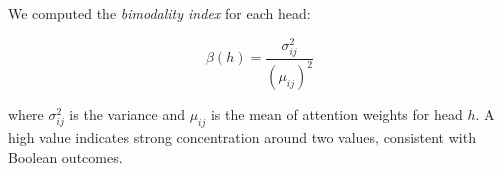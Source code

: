 We computed the \emph{bimodality index} for each head:






$$






\beta(h) = \frac{\sigma_{ij}^2}{(\mu_{ij})^2}






$$






where $\sigma_{ij}^2$ is the variance and $\mu_{ij}$ is the mean of attention weights for head $h$. A high value indicates strong concentration around two values, consistent with Boolean outcomes.













